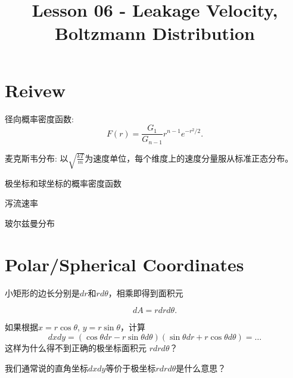 \documentclass[CJK]{beamer}
\title{Lesson 06 - Leakage Velocity, Boltzmann Distribution}
\author{}
\date{}
\begin{document}

\section{Reivew}

\begin{frame}
\bch
{\large
\bitem
\item{径向概率密度函数:
$$F(r) = \frac{G_1}{G_{n-1}} r^{n-1} e^{-r^2/2}.$$}
\item{麦克斯韦分布:
以$\sqrt{\frac{kT}{m}}$为速度单位，每个维度上的速度分量服从标准正态分布。
}
\eitem}
\ech
\end{frame}

\begin{frame}
\bch
\bitem
\item{极坐标和球坐标的概率密度函数}  
\item{泻流速率}
\item{玻尔兹曼分布}  
\eitem
\ech
\end{frame}

\section{Polar/Spherical Coordinates}





\begin{frame}
\bch

    \emini
          {\large
            小矩形的边长分别是$dr$和$r d\theta$，相乘即得到面积元

$$ dA =  r dr d\theta.  $$            
}
    \emini
\ech
\end{frame}

\begin{frame}
\bch
{}
{\large
如果根据$x=r\cos\theta$, $y=r\sin\theta$，计算
$$dx dy = (\cos\theta dr - r\sin\theta d\theta)(\sin\theta dr + r\cos\theta d\theta) = \ldots $$
这样为什么得不到正确的极坐标面积元 $rdrd\theta$？

\skipline

我们通常说的直角坐标$dxdy$等价于极坐标$r dr d\theta$是什么意思？}
\ech
\end{frame}
\end{document}
